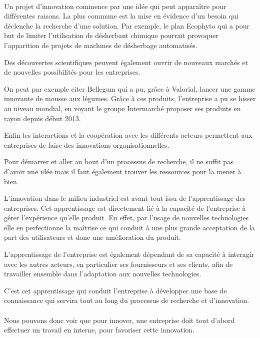\documentclass[a4paper,12pt]{report}
\begin{document}
			\paragraph{}Un projet d’innovation commence par une idée qui peut apparaître pour différentes raisons. La plus commune est la mise en évidence d’un besoin qui déclenche la recherche d’une solution. Par exemple, le plan Ecophyto\cite{RobotsChamps} qui a pour but de limiter l’utilisation de désherbant chimique pourrait provoquer l’apparition de projets de machines de désherbage automatisés.
			 
			Des découvertes scientifiques peuvent également ouvrir de nouveaux marchés et de nouvelles possibilités pour les entreprises. 
			
			On peut par exemple citer Bellegum\cite{Bellegum} qui a pu, grâce à Valorial, lancer une gamme innovante de mousse aux légumes. Grâce à ces produits, l’entreprise a pu se hisser au niveau mondial, en voyant le groupe Intermarché proposer ses produits en rayon depuis début 2013.
			
			Enfin les interactions et la coopération avec les différents acteurs permettent aux entreprises de faire des innovations organisationnelles.
			
			Pour démarrer et aller au bout d’un processus de recherche, il ne suffit pas d’avoir une idée mais il faut également trouver les ressources pour la mener à bien.
			
			L’innovation dans le milieu industriel est avant tout issu de l’apprentissage des entreprises. Cet apprentissage est directement lié à la capacité de l’entreprise à gérer l’expérience qu’elle produit. En effet, par l’usage de nouvelles technologies elle en perfectionne la maîtrise ce qui conduit à une plus grande acceptation de la part des utilisateurs et donc une amélioration du produit. 
			
			L’apprentissage de l’entreprise est également dépendant de sa capacité à interagir avec les autres acteurs, en particulier ses fournisseurs et ses clients, afin de travailler ensemble dans l’adaptation aux nouvelles technologies.
			
			C’est cet apprentissage qui conduit l’entreprise à développer une base de connaissance qui servira tout au long du processus de recherche et d’innovation.
			
			\paragraph{}Nous pouvons donc voir que pour innover, une entreprise doit tout d'abord effectuer un travail en interne, pour favoriser cette innovation.
			
\end{document}
